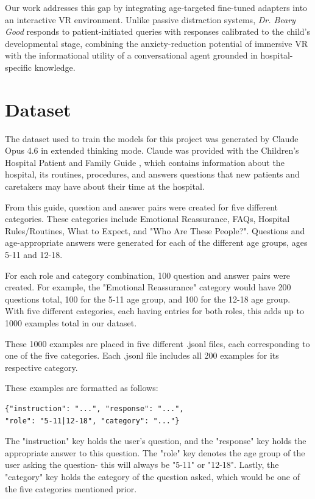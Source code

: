 \documentclass[journal]{IEEEtai}
\begin{document}
Our work addresses this gap by integrating age-targeted fine-tuned adapters into an interactive VR environment. Unlike passive distraction systems, \textit{Dr. Beary Good} responds to patient-initiated queries with responses calibrated to the child's developmental stage, combining the anxiety-reduction potential of immersive VR with the informational utility of a conversational agent grounded in hospital-specific knowledge.

\section{Dataset}
The dataset used to train the models for this project was generated by Claude Opus 4.6 in extended thinking mode. Claude was provided with the Children's Hospital Patient and Family Guide \cite{hospitalguide}, which contains information about the hospital, its routines, procedures, and answers questions that new patients and caretakers may have about their time at the hospital.

From this guide, question and answer pairs were created for five different categories. These categories include Emotional Reassurance, FAQs, Hospital Rules/Routines, What to Expect, and "Who Are These People?". Questions and age-appropriate answers were generated for each of the different age groups, ages 5-11 and 12-18.

For each role and category combination, 100 question and answer pairs were created. For example, the "Emotional Reassurance" category would have 200 questions total, 100 for the 5-11 age group, and 100 for the 12-18 age group. With five different categories, each having entries for both roles, this adds up to 1000 examples total in our dataset.

These 1000 examples are placed in five different .jsonl files, each corresponding to one of the five categories. Each .jsonl file includes all 200 examples for its respective category.

These examples are formatted as follows:

\begin{verbatim}
{"instruction": "...", "response": "...",
"role": "5-11|12-18", "category": "..."}
\end{verbatim}

The "instruction" key holds the user's question, and the "response" key holds the appropriate answer to this question. The "role" key denotes the age group of the user asking the question- this will always be "5-11" or "12-18". Lastly, the "category" key holds the category of the question asked, which would be one of the five categories mentioned prior.
\end{document}
